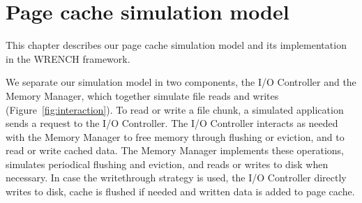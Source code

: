 \chapter{Page cache simulation model}
\label{method}

This chapter describes our page cache simulation model and its implementation 
in the WRENCH framework. 


We separate our simulation model in two components, the I/O
Controller and the Memory Manager, which together simulate
file reads and writes (Figure~\ref{fig:interaction}).
To read or write a file chunk, a simulated application sends a
request to the I/O Controller. The I/O Controller interacts as needed with
the Memory Manager to free memory through flushing or eviction,
and to read or write cached data. The Memory Manager
implements these operations, simulates periodical flushing
and eviction, and reads or writes to disk when necessary.
In case the writethrough strategy is used, the I/O Controller directly writes to disk, 
cache is flushed if needed and written data is added to page cache.

